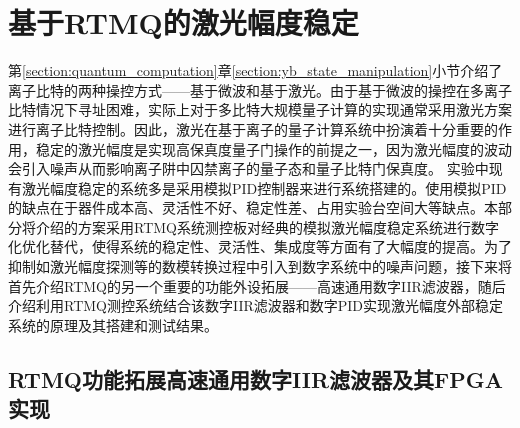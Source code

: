\section[基于RTMQ的激光幅度稳定]{基于RTMQ的激光幅度稳定\label{section:laser_power_locking}}
第\ref{section:quantum_computation}章\ref{section:yb_state_manipulation}小节介绍了离子比特的两种操控方式——基于微波和基于激光。由于基于微波的操控在多离子比特情况下寻址困难，实际上对于多比特大规模量子计算的实现通常采用激光方案进行离子比特控制。因此，激光在基于离子的量子计算系统中扮演着十分重要的作用，稳定的激光幅度是实现高保真度量子门操作的前提之一，因为激光幅度的波动会引入噪声从而影响离子阱中囚禁离子的量子态和量子比特门保真度\cite[]{Blums_Scarabel_Shimizu_Ghadimi_Connell_Händel_Norton_Bridge_Kielpinski_Lobino_et_al_2020}。
实验中现有激光幅度稳定的系统多是采用模拟PID控制器来进行系统搭建的。使用模拟PID的缺点在于器件成本高、灵活性不好、稳定性差、占用实验台空间大等缺点。本部分将介绍的方案采用RTMQ系统测控板对经典的模拟激光幅度稳定系统进行数字化优化替代，使得系统的稳定性、灵活性、集成度等方面有了大幅度的提高。为了抑制如激光幅度探测等的数模转换过程中引入到数字系统中的噪声问题，接下来将首先介绍RTMQ的另一个重要的功能外设拓展——高速通用数字IIR滤波器，随后介绍利用RTMQ测控系统结合该数字IIR滤波器和数字PID实现激光幅度外部稳定系统的原理及其搭建和测试结果。

\subsection[RTMQ功能拓展高速通用数字IIR滤波器及其FPGA实现]{RTMQ功能拓展高速通用数字IIR滤波器及其FPGA实现\label{section:digital_iir}}


